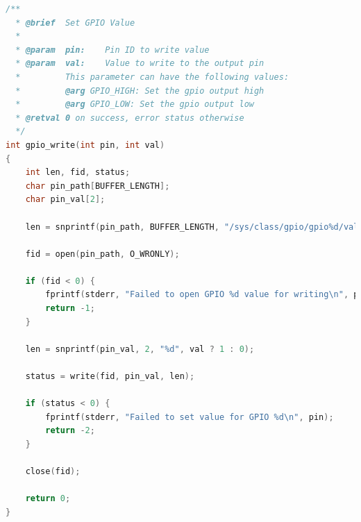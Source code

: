 \begin{fullwidth}
\begin{lstlisting}[language=C]
/**
  * @brief	Set GPIO Value
  *
  * @param  pin:	Pin ID to write value
  * @param  val:	Value to write to the output pin
  *			This parameter can have the following values:
  *			@arg GPIO_HIGH: Set the gpio output high
  *			@arg GPIO_LOW: Set the gpio output low
  * @retval 0 on success, error status otherwise
  */
int gpio_write(int pin, int val)
{
	int len, fid, status;
	char pin_path[BUFFER_LENGTH];
	char pin_val[2];

	len = snprintf(pin_path, BUFFER_LENGTH, "/sys/class/gpio/gpio%d/value", pin);

	fid = open(pin_path, O_WRONLY);

	if (fid < 0) {
		fprintf(stderr, "Failed to open GPIO %d value for writing\n", pin);
		return -1;
	}

	len = snprintf(pin_val, 2, "%d", val ? 1 : 0);

	status = write(fid, pin_val, len);

	if (status < 0) {
		fprintf(stderr, "Failed to set value for GPIO %d\n", pin);
		return -2;
	}

	close(fid);

	return 0;
}
\end{lstlisting}
\end{fullwidth}







